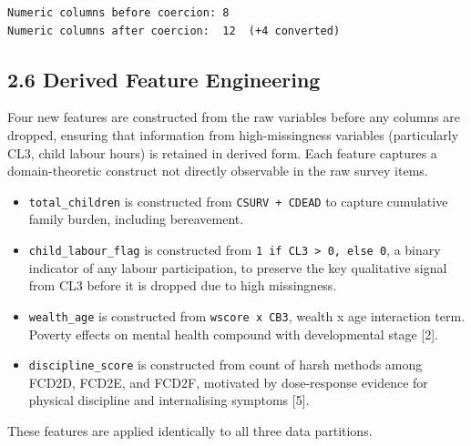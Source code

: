 \documentclass[11pt]{article}
\providecommand{\tightlist}{%
      \setlength{\itemsep}{0pt}\setlength{\parskip}{0pt}}
\begin{document}
    \begin{Verbatim}[commandchars=\\\{\}]
Numeric columns before coercion: 8
Numeric columns after coercion:  12  (+4 converted)
    \end{Verbatim}

    \hypertarget{derived-feature-engineering}{%
\subsection{2.6 Derived Feature
Engineering}\label{derived-feature-engineering}}

Four new features are constructed from the raw variables before any
columns are dropped, ensuring that information from high-missingness
variables (particularly CL3, child labour hours) is retained in derived
form. Each feature captures a domain-theoretic construct not directly
observable in the raw survey items.

\begin{itemize}
\tightlist
\item
  \texttt{total\_children} is constructed from \texttt{CSURV\ +\ CDEAD}
  to capture cumulative family burden, including bereavement.
\item
  \texttt{child\_labour\_flag} is constructed from
  \texttt{1\ if\ CL3\ \textgreater{}\ 0,\ else\ 0}, a binary indicator
  of any labour participation, to preserve the key qualitative signal
  from CL3 before it is dropped due to high missingness.
\item
  \texttt{wealth\_age} is constructed from \texttt{wscore\ x\ CB3},
  wealth x age interaction term. Poverty effects on mental health
  compound with developmental stage {[}2{]}.
\item
  \texttt{discipline\_score} is constructed from count of harsh methods
  among FCD2D, FCD2E, and FCD2F, motivated by dose-response evidence for
  physical discipline and internalising symptoms {[}5{]}.
\end{itemize}

These features are applied identically to all three data partitions.
\end{document}
